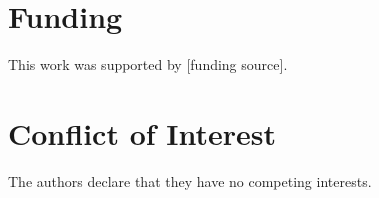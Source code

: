 \section*{Funding}

This work was supported by [funding source].

\section*{Conflict of Interest}

The authors declare that they have no competing interests.
